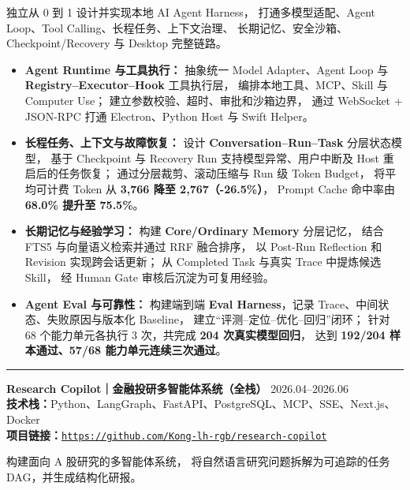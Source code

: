 \documentclass[a4paper,10pt]{article}
\newcommand{\resumeItem}[1]{\item #1}
\newcommand{\projectTitle}[4]{%
    \textbf{\large #1}
    \hfill
    \textcolor{muted}{#2}\\[-1pt]
    \textbf{技术栈：}#3\\[-1pt]
    \textbf{项目链接：}\href{#4}{\nolinkurl{#4}}%
}
\begin{document}
\vspace{2pt}

独立从 0 到 1 设计并实现本地 AI Agent Harness，
打通多模型适配、Agent Loop、Tool Calling、长程任务、上下文治理、
长期记忆、安全沙箱、Checkpoint/Recovery 与 Desktop 完整链路。

\begin{itemize}

\resumeItem{
    \textbf{Agent Runtime 与工具执行：}
    抽象统一 Model Adapter、Agent Loop 与
    \textbf{Registry--Executor--Hook} 工具执行层，
    编排本地工具、MCP、Skill 与 Computer Use；
    建立参数校验、超时、审批和沙箱边界，
    通过 WebSocket + JSON-RPC 打通 Electron、Python Host 与 Swift Helper。
}

\resumeItem{
    \textbf{长程任务、上下文与故障恢复：}
    设计 \textbf{Conversation--Run--Task} 分层状态模型，
    基于 Checkpoint 与 Recovery Run 支持模型异常、用户中断及 Host 重启后的任务恢复；
    通过分层裁剪、滚动压缩与 Run 级 Token Budget，
    将平均可计费 Token 从 \textbf{3,766 降至 2,767（-26.5\%）}，
    Prompt Cache 命中率由 \textbf{68.0\% 提升至 75.5\%}。
}

\resumeItem{
    \textbf{长期记忆与经验学习：}
    构建 \textbf{Core/Ordinary Memory} 分层记忆，
    结合 FTS5 与向量语义检索并通过 RRF 融合排序，
    以 Post-Run Reflection 和 Revision 实现跨会话更新；
    从 Completed Task 与真实 Trace 中提炼候选 Skill，
    经 Human Gate 审核后沉淀为可复用经验。
}

\resumeItem{
    \textbf{Agent Eval 与可靠性：}
    构建端到端 \textbf{Eval Harness}，记录 Trace、中间状态、失败原因与版本化 Baseline，
    建立“评测--定位--优化--回归”闭环；
    针对 68 个能力单元各执行 3 次，共完成 \textbf{204 次真实模型回归}，
    达到 \textbf{192/204 样本通过、57/68 能力单元连续三次通过}。
}

\end{itemize}

\vspace{-5pt}
\noindent\textcolor{muted}{\rule{\textwidth}{0.4pt}}
\vspace{-5pt}

\projectTitle
{Research Copilot｜金融投研多智能体系统（全栈）}
{2026.04--2026.06}
{Python、LangGraph、FastAPI、PostgreSQL、MCP、SSE、Next.js、Docker}
{https://github.com/Kong-lh-rgb/research-copilot}

\vspace{2pt}

构建面向 A 股研究的多智能体系统，
将自然语言研究问题拆解为可追踪的任务 DAG，并生成结构化研报。
\end{document}
